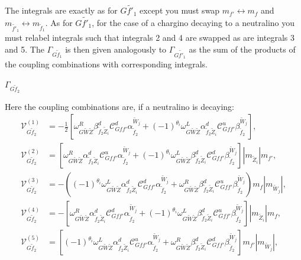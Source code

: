 \documentclass[final,3p,times,pdflatex]{elsarticle}
\begin{document}
The integrals are exactly as for $G \tilde{f'}_1$ except you must swap $m_{f'}
\leftrightarrow m_{f}$ and $m_{\tilde{f'}_1} \leftrightarrow
m_{\tilde{f}_1}$. As for $G \tilde{f'}_1$, for the case of a chargino decaying
to a neutralino you must relabel integrals such that integrals 2 and 4 are
swapped as are integrals 3 and 5. 
The $\Gamma_{G \tilde{f}_1}$ is then given analogously to $\Gamma_{G \tilde{f'}_1}$ as the sum of the products of the coupling combinations with corresponding integrals.

\textbf{\underline{$\Gamma_{G \tilde{f}_2}$}}

Here the coupling combinations are, if a neutralino is decaying:
\begin{align}
\mathcal{V}_{G \tilde{f}_2}^{(1)} &= -\frac{1}{2}[\omega_{G \tilde{W} \tilde{Z}}^R \beta_{\tilde{f}_2 \tilde{Z}_i}^{d} \mathcal{C}_{G f f'}^d \alpha_{\tilde{f}_2}^{\tilde{W}_j} + (-1)^{\theta_i}\omega_{G \tilde{W} \tilde{Z}}^L  \alpha_{\tilde{f}_2 \tilde{Z}_i}^{d} \mathcal{C}_{G f f'}^u \beta_{\tilde{f}_2}^{\tilde{W}_j}], \\
\mathcal{V}_{G \tilde{f}_2}^{(2)} &= [\omega_{G \tilde{W} \tilde{Z}}^R \alpha_{\tilde{f}_2 \tilde{Z}_i}^{d} \mathcal{C}_{G f f'}^u \alpha_{\tilde{f}_2}^{\tilde{W}_j} + (-1)^{\theta_i}\omega_{G \tilde{W} \tilde{Z}}^L \beta_{\tilde{f}_2 \tilde{Z}_i}^{d} \mathcal{C}_{G f f'}^d \beta_{\tilde{f}_2}^{\tilde{W}_j}]|m_{\tilde{Z}_i}|m_{f'}, \\
\mathcal{V}_{G \tilde{f}_2}^{(3)} &= -((-1)^{\theta_i}\omega_{G \tilde{W} \tilde{Z}}^L \alpha_{\tilde{f}_2 \tilde{Z}_i}^{d} \mathcal{C}_{G f f'}^d \alpha_{\tilde{f}_2}^{\tilde{W}_j} +  \omega_{G \tilde{W} \tilde{Z}}^R \beta_{\tilde{f}_2 \tilde{Z}_i}^{d} \mathcal{C}_{G f f'}^u \beta_{\tilde{f}_2}^{\tilde{W}_j})m_{f}|m_{\tilde{W}_j}|, \\
\mathcal{V}_{G \tilde{f}_2}^{(4)} &= -[\omega_{G \tilde{W} \tilde{Z}}^R \alpha_{\tilde{f}_2 \tilde{Z}_i}^{d} \mathcal{C}_{G f f'}^d \alpha_{\tilde{f}_2}^{\tilde{W}_j} + (-1)^{\theta_i}\omega_{G \tilde{W} \tilde{Z}}^L \beta_{\tilde{f}_2 \tilde{Z}_i}^{d} \mathcal{C}_{G f f'}^u \beta_{\tilde{f}_2}^{\tilde{W}_j}]|m_{\tilde{Z}_i}|m_{f}, \\
\mathcal{V}_{G \tilde{f}_2}^{(5)} &= [(-1)^{\theta_i}\omega_{G \tilde{W} \tilde{Z}}^L \alpha_{\tilde{f}_2 \tilde{Z}_i}^{d} \mathcal{C}_{G f f'}^u \alpha_{\tilde{f}_2}^{\tilde{W}_j} + \omega_{G \tilde{W} \tilde{Z}}^R \beta_{\tilde{f}_2 \tilde{Z}_i}^{d} \mathcal{C}_{G f f'}^d \beta_{\tilde{f}_2}^{\tilde{W}_j}]m_{f'}|m_{\tilde{W}_j}|, \\

\end{align}
\end{document}
